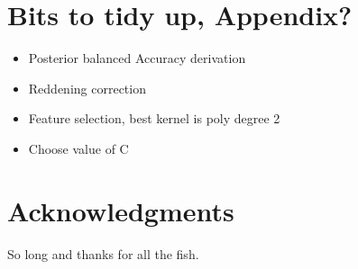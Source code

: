 \documentclass[fleqn,10pt,lineno]{wlpeerj} %
\begin{document}
\section*{Bits to tidy up, Appendix?}
\begin{itemize}
  \item Posterior balanced Accuracy derivation
  \item Reddening correction
  \item Feature selection, best kernel is poly degree 2
  \item Choose value of C
\end{itemize}


\section*{Acknowledgments}

So long and thanks for all the fish.


\end{document}
